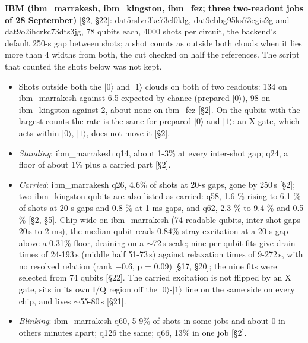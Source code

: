 \documentclass[11pt]{article}
\begin{document}
\textbf{IBM (ibm\_marrakesh, ibm\_kingston, ibm\_fez; three two-readout jobs of 28 September)} {[}\S{}2, \S{}22{]}: dat5rslvr3kc73el0klg, dat9ebbg95ks73egis2g and dat9o2ihcrkc73dts3jg, 78 qubits each, 4000 shots per circuit, the backend's default 250-\textmu s gap between shots; a shot counts as outside both clouds when it lies more than 4 widths from both, the cut checked on half the references. The script that counted the shots below was not kept.

\begin{itemize}
\item Shots outside both the \(|0\rangle\) and \(|1\rangle\) clouds on both of two readouts: 134 on ibm\_marrakesh against 6.5 expected by chance (prepared \(|0\rangle\)), 98 on ibm\_kingston against 2, about none on ibm\_fez {[}\S{}2{]}. On the qubits with the largest counts the rate is the same for prepared \(|0\rangle\) and \(|1\rangle\): an X gate, which acts within {\(|0\rangle\), \(|1\rangle\)}, does not move it {[}\S{}2{]}.
\item \emph{Standing}: ibm\_marrakesh q14, about 1-3\% at every inter-shot gap; q24, a floor of about 1\% plus a carried part {[}\S{}2{]}.
\item \emph{Carried}: ibm\_marrakesh q26, 4.6\% of shots at 20-\textmu s gaps, gone by 250\,\textmu s {[}\S{}2{]}; two ibm\_kingston qubits are also listed as carried: q58, 1.6 \% rising to 6.1 \% of shots at 20-\textmu s gaps and 0.8 \% at 1-ms gaps, and q62, 2.3 \% to 9.4 \% and 0.5 \% {[}\S{}2, \S{}5{]}. Chip-wide on ibm\_marrakesh (74 readable qubits, inter-shot gaps 20\,\textmu s to 2 ms), the median qubit reads 0.84\% stray excitation at a 20-\textmu s gap above a 0.31\% floor, draining on a \(\sim\)72\,\textmu s scale; nine per-qubit fits give drain times of 24-193\,\textmu s (middle half 51-73\,\textmu s) against relaxation times of 9-272\,\textmu s, with no resolved relation (rank \(-\)0.6, p = 0.09) {[}\S{}17, \S{}20{]}; the nine fits were selected from 74 qubits {[}\S{}22{]}. The carried excitation is not flipped by an X gate, sits in its own I/Q region off the \(|0\rangle\)-\(|1\rangle\) line on the same side on every chip, and lives \(\sim\)55-80\,\textmu s {[}\S{}21{]}.
\item \emph{Blinking}: ibm\_marrakesh q60, 5-9\% of shots in some jobs and about 0 in others minutes apart; q126 the same; q66, 13\% in one job {[}\S{}2{]}.
\end{itemize}
\end{document}
